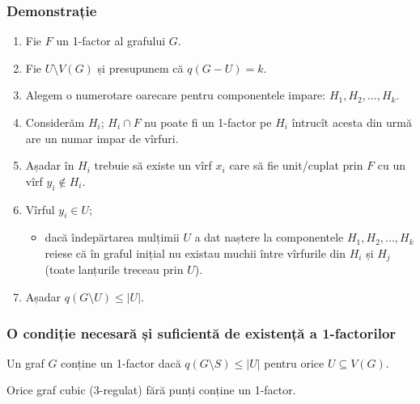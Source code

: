 \begin{frame}
  \frametitle{Demonstrație}

\begin{enumerate}[<+->]
  \item Fie $F$ un 1-factor al grafului $G$.
  \item Fie $U\setminus V(G)$ și presupunem că $q(G-U)=k$.
  \item Alegem o numerotare oarecare pentru componentele impare: $H_1, H_2, ..., H_k$.
  \item Considerăm $H_i$; $H_i\cap F$ nu poate fi un 1-factor pe $H_i$ întrucît acesta din urmă are un numar impar de vîrfuri.
  \item Așadar în $H_i$ trebuie să existe un vîrf $x_i$ care să fie unit/cuplat prin $F$ cu un vîrf $y_i\notin H_i$.
  \item Vîrful $y_i\in U$;
    \begin{itemize}
      \item dacă îndepărtarea mulțimii $U$ a dat naștere la componentele $H_1,H_2,...,H_k$ reiese că în graful inițial nu existau muchii între vîrfurile din $H_i$ și $H_j$ (toate lanțurile treceau prin $U$).
    \end{itemize}
  \item Așadar $q(G\setminus U)\leq |U|$.
\end{enumerate}


\end{frame}

\begin{frame}
  \frametitle{O condiție necesară și suficientă de existență a 1-factorilor}

\begin{theorem}[Tutte]
Un graf $G$ conține un 1-factor dacă  $q(G\setminus S)\leq |U|$ pentru orice $U\subseteq V(G)$. 
\end{theorem}\pause

\begin{corollary}[Petersen]
Orice graf cubic (3-regulat) fără punți conține un 1-factor. 
\end{corollary}




\end{frame}







